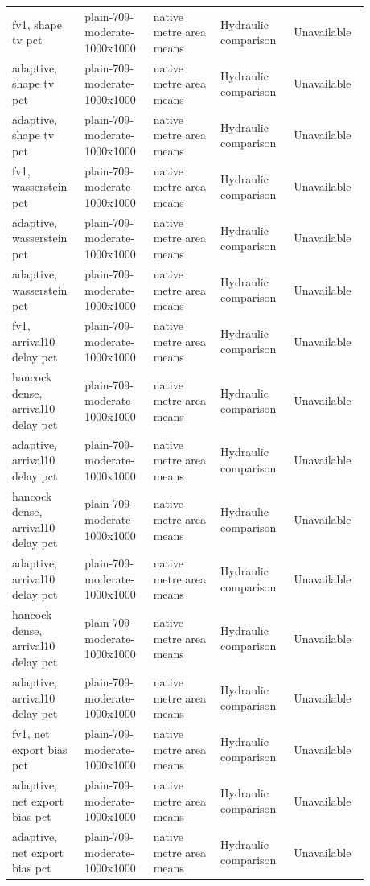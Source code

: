 \begin{longtable}{p{0.1760\linewidth}p{0.1760\linewidth}p{0.1760\linewidth}p{0.1760\linewidth}p{0.1760\linewidth}}
fv1, shape tv pct & plain-709-moderate-1000x1000 & native metre area means & Hydraulic comparison & Unavailable \\
adaptive, shape tv pct & plain-709-moderate-1000x1000 & native metre area means & Hydraulic comparison & Unavailable \\
adaptive, shape tv pct & plain-709-moderate-1000x1000 & native metre area means & Hydraulic comparison & Unavailable \\
fv1, wasserstein pct & plain-709-moderate-1000x1000 & native metre area means & Hydraulic comparison & Unavailable \\
adaptive, wasserstein pct & plain-709-moderate-1000x1000 & native metre area means & Hydraulic comparison & Unavailable \\
adaptive, wasserstein pct & plain-709-moderate-1000x1000 & native metre area means & Hydraulic comparison & Unavailable \\
fv1, arrival10 delay pct & plain-709-moderate-1000x1000 & native metre area means & Hydraulic comparison & Unavailable \\
hancock dense, arrival10 delay pct & plain-709-moderate-1000x1000 & native metre area means & Hydraulic comparison & Unavailable \\
adaptive, arrival10 delay pct & plain-709-moderate-1000x1000 & native metre area means & Hydraulic comparison & Unavailable \\
hancock dense, arrival10 delay pct & plain-709-moderate-1000x1000 & native metre area means & Hydraulic comparison & Unavailable \\
adaptive, arrival10 delay pct & plain-709-moderate-1000x1000 & native metre area means & Hydraulic comparison & Unavailable \\
hancock dense, arrival10 delay pct & plain-709-moderate-1000x1000 & native metre area means & Hydraulic comparison & Unavailable \\
adaptive, arrival10 delay pct & plain-709-moderate-1000x1000 & native metre area means & Hydraulic comparison & Unavailable \\
fv1, net export bias pct & plain-709-moderate-1000x1000 & native metre area means & Hydraulic comparison & Unavailable \\
adaptive, net export bias pct & plain-709-moderate-1000x1000 & native metre area means & Hydraulic comparison & Unavailable \\
adaptive, net export bias pct & plain-709-moderate-1000x1000 & native metre area means & Hydraulic comparison & Unavailable \\

\end{longtable}
